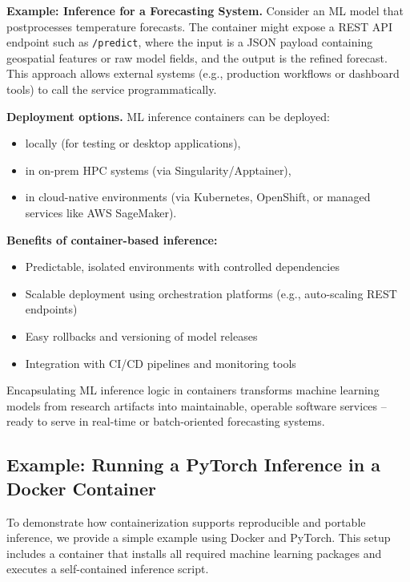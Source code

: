 {\bf Example: Inference for a Forecasting System.} Consider an ML model that postprocesses temperature forecasts. The container might expose a REST API endpoint such as \texttt{/predict}, where the input is a JSON payload containing geospatial features or raw model fields, and the output is the refined forecast. This approach allows external systems (e.g., production workflows or dashboard tools) to call the service programmatically.

{\bf Deployment options.} ML inference containers can be deployed:
\begin{itemize}
	\item locally (for testing or desktop applications),
	\item in on-prem HPC systems (via Singularity/Apptainer),
	\item in cloud-native environments (via Kubernetes, OpenShift, or managed services like AWS SageMaker).
\end{itemize}

{\bf Benefits of container-based inference:}
\begin{itemize}
	\item Predictable, isolated environments with controlled dependencies
	\item Scalable deployment using orchestration platforms (e.g., auto-scaling REST endpoints)
	\item Easy rollbacks and versioning of model releases
	\item Integration with CI/CD pipelines and monitoring tools
\end{itemize}

Encapsulating ML inference logic in containers transforms machine learning models from research artifacts into maintainable, operable software services -- ready to serve in real-time or batch-oriented forecasting systems.

%
\subsection{Example: Running a PyTorch Inference in a Docker Container}

To demonstrate how containerization supports reproducible and portable inference, we provide a simple example using Docker and PyTorch. This setup includes a container that installs all required machine learning packages and executes a self-contained inference script.

